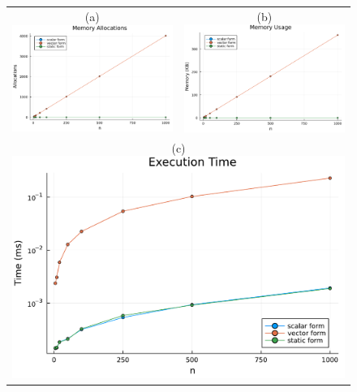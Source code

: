 \documentclass[12pt,	%
	a4paper,		%
	twoside,		%
	openright,		%
	titlepage,%
	]{book}
\theoremstyle{definition}
\begin{document}
\begin{figure}[!ht]
\centering
\begin{tabular}{cc}
      \footnotesize{(a)}\includegraphics[width=0.48\linewidth]{Plots/memory_allocations.pdf}
 &    \footnotesize{(b)}\includegraphics[width=0.48\linewidth]{Plots/memory_usage.pdf} \\[10pt] 
    \multicolumn{2}{c}{\footnotesize{(c)}\includegraphics[width=1\linewidth]{Plots/execution_time.pdf}}\\

\end{tabular}
\end{figure}
\end{document}
